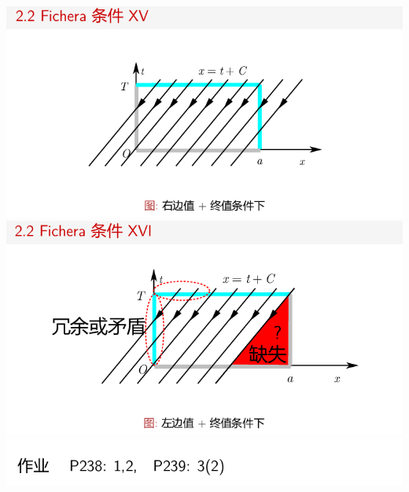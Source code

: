 \documentclass[11pt,a4paper]{ctexart}
\begin{document}
\begin{paracol}{2}
\includegraphics[width=\linewidth]{chap05_36.png}
\includegraphics[width=\linewidth]{chap05_37.png}
\includegraphics[width=\linewidth]{chap05_38.png}
\newpage




\small
\switchcolumn

\newpage



\end{paracol}
\end{document}
